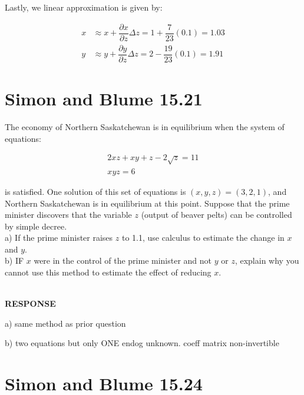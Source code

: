 \documentclass{article}
\begin{document}
Lastly, we linear approximation is given by: 

\begingroup
\addtolength{\jot}{1em} %
\begin{align*}
    x & \approx x + \dfrac{\partial x}{ \partial z} \Delta z = 1+\dfrac{7}{23}(0.1)=1.03\\
    y & \approx y + \dfrac{\partial y}{ \partial z} \Delta z = 2-\dfrac{19}{23}(0.1)=1.91
\end{align*}
\endgroup


\pagebreak
\section{Simon and Blume 15.21}
\colorbox{gray!30}{
\begin{minipage}{\textwidth}
The economy of Northern Saskatchewan is in equilibrium when the system of equations: 

\begingroup
\addtolength{\jot}{1em} %
\begin{align*}
    2xz + xy + z - 2\sqrt{z}=11 \\
    xyz=6
\end{align*}
\endgroup

is satisfied. One solution of this set of equations is $(x,y,z)=(3,2,1)$, and Northern Saskatchewan is in equilibrium at this point. Suppose that the prime minister discovers that the variable $z$ (output of beaver pelts) can be controlled by simple decree. \\

a) If the prime minister raises $z$ to 1.1, use calculus to estimate the change in $x$ and $y$. \\

b) IF $x$ were in the control of the prime minister and not $y$ or $z$, explain why you cannot use this method to estimate the effect of reducing $x$.
\end{minipage}
} \\

\textbf{RESPONSE}

a) same method as prior question 

b) two equations but only ONE endog unknown. coeff matrix non-invertible 

\pagebreak
\section{Simon and Blume 15.24}
\end{document}
